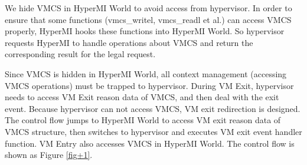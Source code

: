 \documentclass[conference]{IEEEtran}
\begin{document}
We hide VMCS in HyperMI World to avoid access from hypervisor. 
In order to ensure that some functions (vmcs\_writel, vmcs\_readl et al.) can access VMCS properly, HyperMI hooks these functions into HyperMI World. So hypervisor requests HyperMI to handle operations about VMCS and return the corresponding result for the legal request. 

Since VMCS is hidden in HyperMI World, all context management (accessing VMCS operations) must be trapped to hypervisor. During VM Exit, hypervisor needs to access VM Exit reason data of VMCS, and then deal with the exit event.
 Because hypervisor can not access VMCS, VM exit redirection is designed. The control flow jumps to HyperMI World to access VM exit reason data of VMCS structure, then switches to hypervisor and executes VM exit event handler function. VM Entry also accesses VMCS in HyperMI World. The control flow is shown as Figure \ref{fig+1}.
\end{document}

